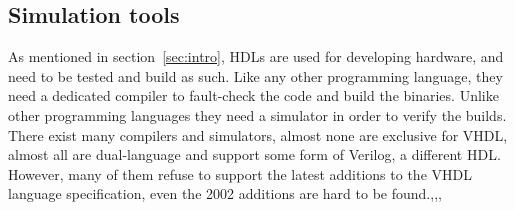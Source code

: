 \documentclass[11pt,british]{article}
\begin{document}


\subsection{Simulation tools}
As mentioned in section~\ref{sec:intro}, \gls{HDL}s are used for developing hardware, and need to be tested and build as such. Like any other programming language, they need a dedicated compiler to fault-check the code and build the binaries. Unlike other programming languages they need a simulator in order to verify the builds. There exist many compilers and simulators, almost none are exclusive for \gls{VHDL}, almost all are dual-language and support some form of Verilog, a different HDL. However, many of them refuse to support the latest additions to the VHDL language specification, even the 2002 additions are hard to be found.\cite{ActiveHDL},\cite{Cadence},\cite{ISE},\cite{Quartus}
\end{document}
